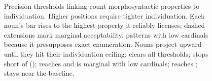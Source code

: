 \begin{figure}[t]
\caption{Precision thresholds linking count morphosyntactic properties to individuation. Higher positions require tighter individuation. Each noun's bar rises to the highest property it reliably licenses; dashed extensions mark marginal acceptability.  patterns with low cardinals because it presupposes exact enumeration. Nouns project upward until they hit their individuation ceiling:  clears all thresholds;  stops short of ();  reaches  and is marginal with low cardinals;  reaches ;  stays near the baseline.}
\label{fig:threshold}
\end{figure}
